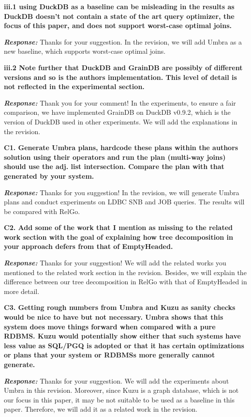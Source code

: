 \textbf{
iii.1 using DuckDB as a baseline can be misleading in the results
as DuckDB doesn't not contain a state of the art query optimizer, the focus of this paper, and does not support worst-case optimal joins.}

\textbf{\textit{Response: }}
Thanks for your suggestion. In the revision, we will add Umbra as a new baseline, which supports worst-case optimal joins.

\textbf{
iii.2 Note further that DuckDB and GrainDB are possibly of different versions and so is the authors implementation. This level of detail is not reflected in the experimental section.}

\textbf{\textit{Response: }}
Thank you for your comment! In the experiments, to ensure a fair comparison, we have implemented GrainDB on DuckDB v0.9.2, which is the version of DuckDB used in other experiments. We will add the explanations in the revision.


\textbf{
C1. Generate Umbra plans, hardcode these plans within the authors solution using their operators and run the plan (multi-way joins) should use the adj. list intersection. Compare the plan with that generated by your system. }

\textbf{\textit{Response: }}
Thanks for you suggestion! In the revision, we will generate Umbra plans and conduct experiments on LDBC SNB and JOB queries. The results will be compared with RelGo.

\textbf{
C2. Add some of the work that I mention as missing to the related work section with the goal of explaining how tree decomposition in your approach defers from that of EmptyHeaded. }

\textbf{\textit{Response: }} Thanks for your suggestion! We will add the related works you mentioned to the related work section in the revision. Besides, we will explain the difference between our tree decomposition in RelGo with that of EmptyHeaded in more detail.


\textbf{
C3. Getting rough numbers from Umbra and Kuzu as sanity checks would be nice to have but not necessary. Umbra shows that this system does move things forward when compared with a pure RDBMS. Kuzu would potentially show either that such systems have less value as SQL/PGQ is adopted or that it has certain optimizations or plans that your system or RDBMSs more generally cannot generate. }

\textbf{\textit{Response: }}
Thanks for your suggestion. We will add the experiments about Umbra in this revision. Moreover, since Kuzu is a graph database, which is not our focus in this paper, it may be not suitable to be used as a baseline in this paper. Therefore, we will add it as a related work in the revision.


